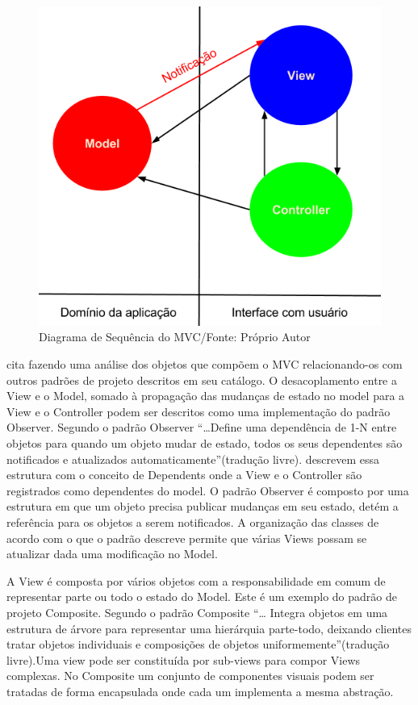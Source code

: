 \begin{figure}[h]
	\centering
	\includegraphics[scale=0.5]{img/mvc.png}
	\caption{Diagrama de Sequência do MVC/Fonte: Próprio Autor}
	\label{mvc}
\end{figure}

 cita  fazendo uma análise dos
objetos que compõem o MVC relacionando-os com outros padrões de projeto
descritos em seu catálogo.
O desacoplamento entre a View e o Model, somado à propagação das mudanças de
estado no model para a View e o Controller podem ser
descritos como uma implementação do padrão Observer. Segundo \cite{gof} o padrão
Observer ``\ldots Define uma dependência de 1-N entre objetos para quando um
objeto mudar de estado, todos os seus dependentes são notificados e atualizados
automaticamente''(tradução livre).  descrevem essa
estrutura com o conceito de Dependents onde a View e o Controller são
registrados como dependentes do model. O padrão Observer é composto por uma
estrutura em que um objeto precisa publicar mudanças em seu estado, detém a
referência para os objetos a serem notificados. A organização das classes de
acordo com o que o padrão descreve permite que várias Views possam se atualizar
dada uma modificação no Model.

A View é composta por vários objetos com a responsabilidade em comum de
representar parte ou todo o estado do Model. Este é um exemplo do padrão de
projeto Composite. Segundo  o padrão Composite ``\ldots
Integra objetos em uma estrutura de árvore para representar uma hierárquia
parte-todo, deixando clientes tratar objetos individuais e composições de
objetos uniformemente''(tradução livre).Uma view pode ser constituída por
sub-views para compor Views complexas. No Composite  um conjunto de componentes
visuais podem ser tratadas de forma encapsulada onde cada um implementa a
mesma abstração. 

